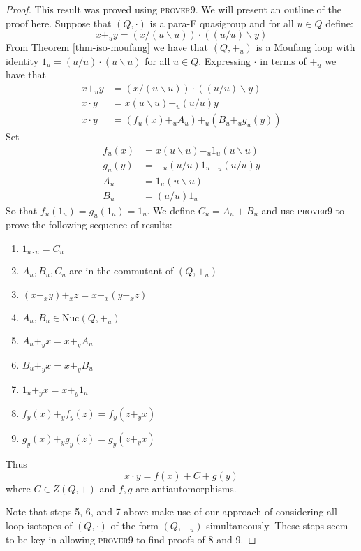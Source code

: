 \documentclass[12pt]{report}
\theoremstyle{definition}
\newcommand{\ldv}{\backslash}       %
\newcommand{\rdv}{/}                %
\newcommand{\nuc}{\text{Nuc}}       %
\begin{document}
\begin{proof}
  This result was proved using \textsc{prover9}. We will present an outline of the proof here.
  Suppose that $(Q, \cdot)$ is a para-F quasigroup and for all $u\in Q$ define:
  \[x +_u y = (x\rdv(u\ldv u))\cdot ((u\rdv u)\ldv y)\]
  From Theorem \ref{thm-iso-moufang} we have that $(Q, +_u)$ is a Moufang loop with
    identity $1_u = (u\rdv u)\cdot (u\ldv u)$ for all $u\in Q$. Expressing $\cdot$ in terms
    of $+_u$  we have that
  \begin{align*}
    x +_u y &= (x\rdv(u\ldv u))\cdot ((u\rdv u)\ldv y)\\
    x\cdot y &= x(u\ldv u) +_u (u\rdv u)y\\
    x\cdot y &= (f_u(x) +_u A_u) +_u (B_u +_u g_u(y))
  \end{align*}
  Set
  \begin{align*}
    f_u(x) &= x(u\ldv u) -_u 1_u(u\ldv u)\\
    g_u(y) &= -_u(u\rdv u)1_u +_u (u\rdv u)y\\
    A_u &= 1_u(u\ldv u)\\
    B_u &= (u\rdv u) 1_u
  \end{align*}
    So that $f_u(1_u) = g_u(1_u) = 1_u$. We define $C_u = A_u + B_u$ and use \textsc{prover9} to prove
      the following sequence of results:
\begin{enumerate}
  \item $1_{u\cdot u} = C_u$
  \item $A_u, B_u, C_u$ are in the commutant of $(Q, +_u)$
  \item $(x +_x y) +_x z = x +_x (y +_x z)$
  \item $A_u, B_u\in\nuc(Q, +_u)$
  \item $A_u +_y x = x +_y A_u$
  \item $B_u +_y x = x +_y B_u$
  \item $1_u +_y x = x +_y 1_u$
  \item $f_y(x) +_y f_y(z) = f_y(z +_y x)$
  \item $g_y(x) +_y g_y(z) = g_y(z +_y x)$
\end{enumerate}

  Thus
  \[x\cdot y = f(x) + C + g(y)\]
  where $C\in Z(Q, +)$ and $f, g$ are antiautomorphisms.

  Note that steps 5, 6, and 7 above make use of our approach of considering all loop isotopes of
    $(Q, \cdot)$ of the form $(Q, +_u)$ simultaneously. These steps seem to be key in allowing
    \textsc{prover9} to find proofs of 8 and 9.
\end{proof}
\end{document}
